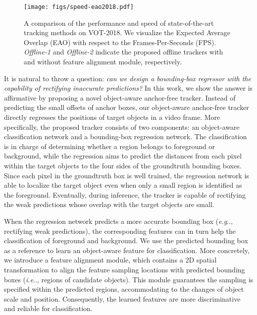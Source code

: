 \documentclass[runningheads]{llncs}
\makeatletter
\DeclareRobustCommand\onedot{\futurelet\@let@token\@onedot}
\def\@onedot{\ifx\@let@token.\else.\null\fi\xspace}
\def\eg{\emph{e.g}\onedot} \def\Eg{\emph{E.g}\onedot}
\def\ie{\emph{i.e}\onedot} \def\Ie{\emph{I.e}\onedot}
\makeatother
\begin{document}
\begin{figure}[t]
		\vspace{-1.3em}
	\centering
	\begin{minipage}[c]{.45\textwidth}
\begin{flushleft}
			\caption{A comparison of the performance and speed of state-of-the-art tracking methods on VOT-2018. We visualize the Expected Average Overlap (EAO) with respect to the Frames-Per-Seconds (FPS). \emph{Offline-1} and \emph{Offline-2} indicate the proposed offline trackers with and without feature alignment module, respectively.}\label{VOT18FIG}
		\end{flushleft}
	\end{minipage}\hspace{0.1em}
	\begin{minipage}[c]{.5\textwidth}
\centering
		\begin{flushright}
\texttt{[image: figs/speed-eao2018.pdf]}
		\end{flushright}
	\end{minipage}
		\vspace{-3em}
\end{figure}



It is natural to throw a question: \emph{can we design a bounding-box regressor with the capability of rectifying inaccurate predictions?} In this work, we show the answer is affirmative by proposing a novel object-aware anchor-free tracker. Instead of predicting the small offsets of anchor boxes, our object-aware anchor-free tracker directly regresses the positions of target objects in a video frame. More specifically, the proposed tracker consists of two components: an object-aware classification network and a bounding-box regression network. The classification is in charge of determining whether a region belongs to foreground or background, while the regression aims to predict the distances from each pixel within the target objects to the four sides of the groundtruth bounding boxes. Since each pixel in the groundtruth box is well trained, the regression network is able to localize the target object even when only a small region is identified as the foreground. Eventually, during inference, the tracker is capable of rectifying the weak predictions whose overlap with the target objects are small.

When the regression network predicts a more accurate bounding box (\eg, rectifying weak predictions), the corresponding features can in turn help the classification of foreground and background. We use the predicted bounding box as a reference to learn an object-aware feature for classification. More concretely, we introduce a feature alignment module, which contains a 2D spatial transformation to align the feature sampling locations with predicted bounding boxes (\ie, regions of candidate objects). This module guarantees the sampling is specified within the predicted regions, accommodating to the changes of object scale and position. Consequently, the learned features are more discriminative and reliable for classification.
\end{document}
